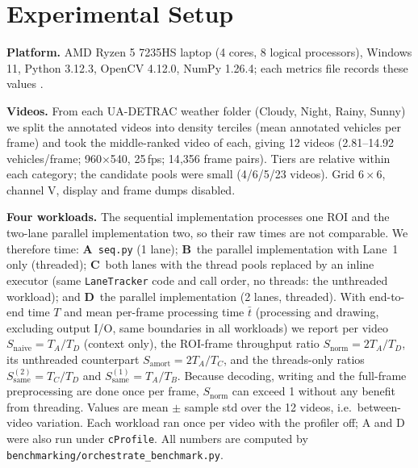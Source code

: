 \documentclass[conference]{IEEEtran}
\newcommand{\code}[1]{\texttt{#1}}
\begin{document}
\section{Experimental Setup}
\label{sec:experiments}
\textbf{Platform.} AMD Ryzen 5 7235HS laptop (4 cores, 8 logical
processors), Windows 11, Python 3.12.3, OpenCV 4.12.0, NumPy 1.26.4;
each metrics file records these values \cite{beyer2019}.

\textbf{Videos.} From each UA-DETRAC weather folder (Cloudy, Night,
Rainy, Sunny) we split the annotated videos into density terciles (mean
annotated vehicles per frame) and took the middle-ranked video of each,
giving 12 videos (2.81--14.92 vehicles/frame; 960$\times$540, 25\,fps;
14{,}356 frame pairs). Tiers are relative within each category; the
candidate pools were small (4/6/5/23 videos). Grid $6\times6$, channel V,
display and frame dumps disabled.

\textbf{Four workloads.} The sequential implementation processes one
ROI and the two-lane parallel implementation two, so their raw times are
not comparable. We therefore time: \textbf{A}~\code{seq.py} (1 lane);
\textbf{B}~the parallel implementation with Lane~1 only (threaded);
\textbf{C}~both lanes with the thread pools replaced by an inline executor
(same \code{LaneTracker} code and call order, no threads: the unthreaded
workload); and \textbf{D}~the parallel implementation (2 lanes, threaded). With end-to-end time $T$ and mean per-frame
processing time $\bar t$ (processing and drawing, excluding output I/O,
same boundaries in all workloads) we report per video
$S_{\text{naive}}=T_A/T_D$ (context only), the ROI-frame throughput ratio
$S_{\text{norm}}=2T_A/T_D$, its unthreaded counterpart
$S_{\text{amort}}=2T_A/T_C$, and the threads-only ratios
$S_{\text{same}}^{(2)}=T_C/T_D$ and $S_{\text{same}}^{(1)}=T_A/T_B$.
Because decoding, writing and the full-frame preprocessing are done once
per frame, $S_{\text{norm}}$ can exceed 1 without any benefit from
threading. Values are mean $\pm$ sample std over the 12 videos, i.e.\
between-video variation. Each workload ran once per video with the
profiler off; A and D were also run under \code{cProfile}. All numbers
are computed by \code{benchmarking/orchestrate\_benchmark.py}.
\end{document}
